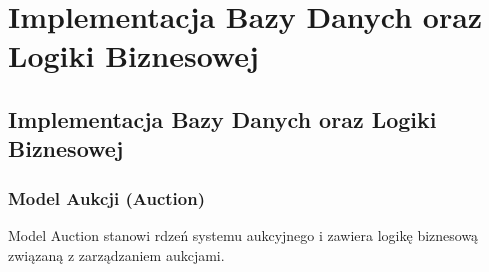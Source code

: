 \section{Implementacja Bazy Danych oraz Logiki Biznesowej}

\subsection{Implementacja Bazy Danych oraz Logiki Biznesowej}

\subsubsection{Model Aukcji (Auction)}

Model Auction stanowi rdzeń systemu aukcyjnego i zawiera logikę biznesową związaną z zarządzaniem aukcjami.

